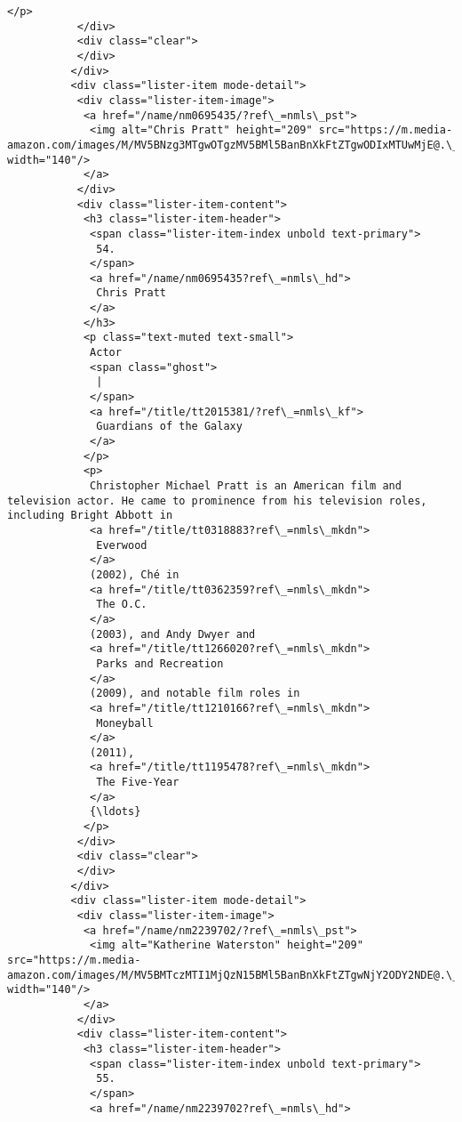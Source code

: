 \documentclass[11pt]{article}
\begin{document}
\begin{Verbatim}[commandchars=\\\{\}]
            </p>
           </div>
           <div class="clear">
           </div>
          </div>
          <div class="lister-item mode-detail">
           <div class="lister-item-image">
            <a href="/name/nm0695435/?ref\_=nmls\_pst">
             <img alt="Chris Pratt" height="209" src="https://m.media-amazon.com/images/M/MV5BNzg3MTgwOTgzMV5BMl5BanBnXkFtZTgwODIxMTUwMjE@.\_V1\_UX140\_CR0,0,140,209\_AL\_.jpg" width="140"/>
            </a>
           </div>
           <div class="lister-item-content">
            <h3 class="lister-item-header">
             <span class="lister-item-index unbold text-primary">
              54.
             </span>
             <a href="/name/nm0695435?ref\_=nmls\_hd">
              Chris Pratt
             </a>
            </h3>
            <p class="text-muted text-small">
             Actor
             <span class="ghost">
              |
             </span>
             <a href="/title/tt2015381/?ref\_=nmls\_kf">
              Guardians of the Galaxy
             </a>
            </p>
            <p>
             Christopher Michael Pratt is an American film and television actor. He came to prominence from his television roles, including Bright Abbott in
             <a href="/title/tt0318883?ref\_=nmls\_mkdn">
              Everwood
             </a>
             (2002), Ché in
             <a href="/title/tt0362359?ref\_=nmls\_mkdn">
              The O.C.
             </a>
             (2003), and Andy Dwyer and
             <a href="/title/tt1266020?ref\_=nmls\_mkdn">
              Parks and Recreation
             </a>
             (2009), and notable film roles in
             <a href="/title/tt1210166?ref\_=nmls\_mkdn">
              Moneyball
             </a>
             (2011),
             <a href="/title/tt1195478?ref\_=nmls\_mkdn">
              The Five-Year
             </a>
             {\ldots}
            </p>
           </div>
           <div class="clear">
           </div>
          </div>
          <div class="lister-item mode-detail">
           <div class="lister-item-image">
            <a href="/name/nm2239702/?ref\_=nmls\_pst">
             <img alt="Katherine Waterston" height="209" src="https://m.media-amazon.com/images/M/MV5BMTczMTI1MjQzN15BMl5BanBnXkFtZTgwNjY2ODY2NDE@.\_V1\_UY209\_CR128,0,140,209\_AL\_.jpg" width="140"/>
            </a>
           </div>
           <div class="lister-item-content">
            <h3 class="lister-item-header">
             <span class="lister-item-index unbold text-primary">
              55.
             </span>
             <a href="/name/nm2239702?ref\_=nmls\_hd">

\end{Verbatim}
\end{document}
